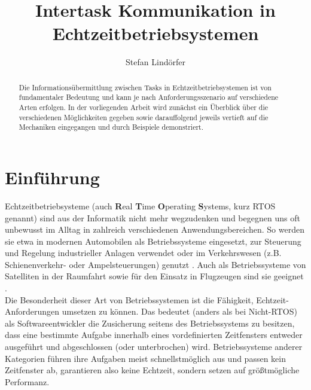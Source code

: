 \documentclass{llncs}
\begin{document}
\title{Intertask Kommunikation in Echtzeitbetriebsystemen}
\author{Stefan Lindörfer\\
}


\maketitle

\renewcommand{\abstractname}{Abstract}

\begin{abstract}
	Die Informationsübermittlung zwischen Tasks in Echtzeitbetriebsystemen ist von fundamentaler Bedeutung und kann je nach Anforderungsszenario auf verschiedene Arten erfolgen. In der vorliegenden Arbeit wird zunächst ein Überblick über die verschiedenen Möglichkeiten gegeben sowie darauffolgend jeweils vertieft auf die Mechaniken eingegangen und durch Beispiele demonstriert.
\end{abstract}

\section{Einführung}
\label{subsec:Einführung}
Echtzeitbetriebsysteme (auch \textbf{R}eal \textbf{T}ime \textbf{O}perating \textbf{S}ystems, kurz RTOS genannt) sind aus der Informatik nicht mehr wegzudenken und begegnen uns oft unbewusst im Alltag in zahlreich verschiedenen Anwendungsbereichen. So werden sie etwa in modernen Automobilen als Betriebssysteme eingesetzt, zur Steuerung und Regelung industrieller Anlagen verwendet oder im Verkehrswesen (z.B. Schienenverkehr- oder Ampelsteuerungen) genutzt \autocite[vgl.][157]{Winzker2008}. Auch als Betriebssysteme von Satelliten in der Raumfahrt sowie für den Einsatz in Flugzeugen sind sie geeignet \autocite{Wuerzburg2019}.\\

Die Besonderheit dieser Art von Betriebssystemen ist die Fähigkeit, Echtzeit-Anforderungen umsetzen zu können. Das bedeutet (anders als bei Nicht-RTOS) als Softwareentwickler die Zusicherung seitens des Betriebssystems zu besitzen, dass eine bestimmte Aufgabe innerhalb eines vordefinierten Zeitfensters entweder ausgeführt und abgeschlossen (oder unterbrochen) wird. Betriebssysteme anderer Kategorien führen ihre Aufgaben meist schnellstmöglich aus und passen kein Zeitfenster ab, garantieren also keine Echtzeit, sondern setzen auf größtmögliche Performanz.\\
\end{document}
